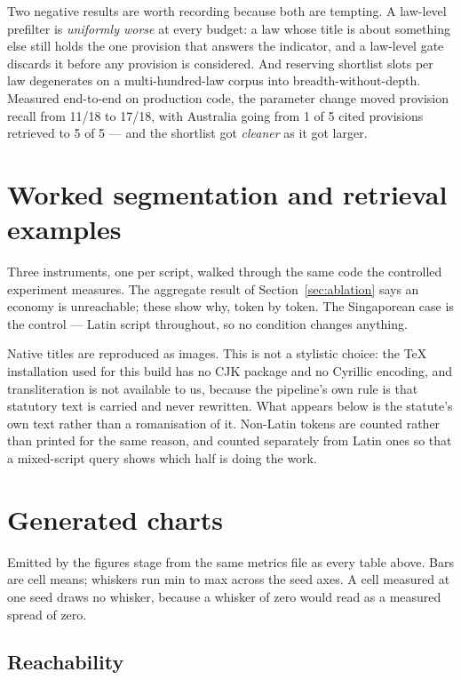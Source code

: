 \documentclass{article}
\begin{document}
Two negative results are worth recording because both are tempting. A law-level
prefilter is \emph{uniformly worse} at every budget: a law whose title is about
something else still holds the one provision that answers the indicator, and a
law-level gate discards it before any provision is considered. And reserving
shortlist slots per law degenerates on a multi-hundred-law corpus into
breadth-without-depth. Measured end-to-end on production code, the parameter
change moved provision recall from 11/18 to 17/18, with Australia going from 1
of 5 cited provisions retrieved to 5 of 5 --- and the shortlist got
\emph{cleaner} as it got larger.


\section{Worked segmentation and retrieval examples}
\label{app:cases}

Three instruments, one per script, walked through the same code the controlled
experiment measures. The aggregate result of Section~\ref{sec:ablation} says an
economy is unreachable; these show why, token by token. The Singaporean case is
the control --- Latin script throughout, so no condition changes anything.

Native titles are reproduced as images. This is not a stylistic choice: the TeX
installation used for this build has no CJK package and no Cyrillic encoding, and
transliteration is not available to us, because the pipeline's own rule is that
statutory text is carried and never rewritten. What appears below is the
statute's own text rather than a romanisation of it. Non-Latin tokens are counted
rather than printed for the same reason, and counted separately from Latin ones
so that a mixed-script query shows which half is doing the work.



\section{Generated charts}
\label{app:charts}

Emitted by the figures stage from the same metrics file as every table above.
Bars are cell means; whiskers run min to max across the seed axes. A cell
measured at one seed draws no whisker, because a whisker of zero would read as a
measured spread of zero.

\subsection{Reachability}

\end{document}
